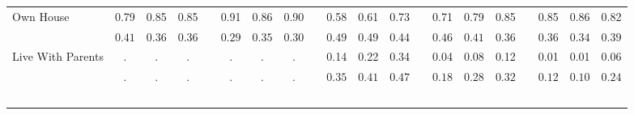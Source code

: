 \begin{center}
{\begin{longtable}{L{5cm} c c c p{.5cm} c c c p{.5cm} c c c p{.5cm} c c c p{.5cm} c c c}
 \quad Own House & 0.79 &      0.85 &      0.85 & &      0.91 &      0.86 &      0.90 & &      0.58 &      0.61 &      0.73 & &      0.71 &      0.79 &      0.85 & &      0.85 &      0.86 &      0.82 \\*
 \quad & $\mathit{     0.41}$ & $\mathit{     0.36}$ & $\mathit{     0.36}$ & & $\mathit{     0.29}$ & $\mathit{     0.35}$ & $\mathit{     0.30}$ & & $\mathit{     0.49}$ & $\mathit{     0.49}$ & $\mathit{     0.44}$ & & $\mathit{     0.46}$ & $\mathit{     0.41}$ & $\mathit{     0.36}$ & & $\mathit{     0.36}$ & $\mathit{     0.34}$ & $\mathit{     0.39}$ \\[.2em]
 \quad Live With Parents & . &         . &         . & &         . &         . &         . & &      0.14 &      0.22 &      0.34 & &      0.04 &      0.08 &      0.12 & &      0.01 &      0.01 &      0.06 \\*
 \quad & $\mathit{        .}$ & $\mathit{        .}$ & $\mathit{        .}$ & & $\mathit{        .}$ & $\mathit{        .}$ & $\mathit{        .}$ & & $\mathit{     0.35}$ & $\mathit{     0.41}$ & $\mathit{     0.47}$ & & $\mathit{     0.18}$ & $\mathit{     0.28}$ & $\mathit{     0.32}$ & & $\mathit{     0.12}$ & $\mathit{     0.10}$ & $\mathit{     0.24}$ \\[.2em]
 ~\\[-.5em]
\hline
\end{longtable}
}
\end{center}
